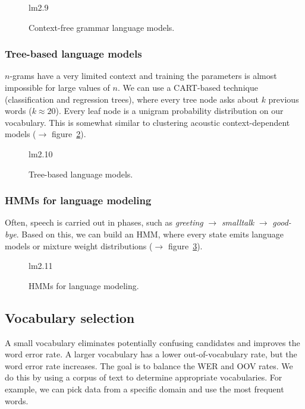 \documentclass[11pt]{article}
\begin{document}
\begin{figure}[htb]
    \begin{minipage}{\linewidth}
        \vspace{4cm}
        \hfill \scriptsize lm2.9
    \end{minipage}
    \caption{\label{fig:contextFreeGrammarLM} Context-free grammar language models.}
\end{figure}

\subsubsection{Tree-based language models}
$n$-grams have a very limited context and training the parameters is almost impossible for large values of $n$. We can use a CART-based technique (classification and regression trees), where every tree node asks about $k$ previous words ($k \approx 20$). Every leaf node is a unigram probability distribution on our vocabulary. This is somewhat similar to clustering acoustic context-dependent models ($\to$ figure~\ref{fig:treeBasedLM}).

\begin{figure}[htb]
    \begin{minipage}{\linewidth}
        \vspace{4cm}
        \hfill \scriptsize lm2.10
    \end{minipage}
    \caption{\label{fig:treeBasedLM} Tree-based language models.}
\end{figure}

\subsubsection{HMMs for language modeling}

Often, speech is carried out in phases, such as \textit{greeting} $\rightarrow$ \textit{smalltalk} $\rightarrow$ \textit{good-bye}. Based on this, we can build an HMM, where every state emits language models or mixture weight distributions ($\to$ figure~\ref{fig:hmmLM}).

\begin{figure}[htb]
    \begin{minipage}{\linewidth}
        \vspace{3cm}
        \hfill \scriptsize lm2.11
    \end{minipage}
    \caption{\label{fig:hmmLM} HMMs for language modeling.}
\end{figure}

\subsection{Vocabulary selection}
A small vocabulary eliminates potentially confusing candidates and improves the word error rate. A larger vocabulary has a lower out-of-vocabulary rate, but the word error rate increases. The goal is to balance the WER and OOV rates. We do this by using a corpus of text to determine appropriate vocabularies. For example, we can pick data from a specific domain and use the most frequent words.
\end{document}
